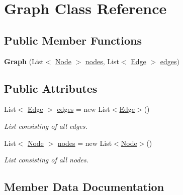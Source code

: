 \hypertarget{class_graph}{}\section{Graph Class Reference}
\label{class_graph}
\subsection*{Public Member Functions}
\begin{DoxyCompactItemize}
\item 
\mbox{\label{class_graph_a4a67baa48ef20f9fdbd80b0b7e5788d2}} 
{\bfseries Graph} (List$<$ \mbox{\hyperlink{class_node}{Node}} $>$ \mbox{\hyperlink{class_graph_a5ecc9c1538b1c81f615e5cfd12f29816}{nodes}}, List$<$ \mbox{\hyperlink{class_edge}{Edge}} $>$ \mbox{\hyperlink{class_graph_a4647d3fa90942e128f3f4612a4838c23}{edges}})
\end{DoxyCompactItemize}
\subsection*{Public Attributes}
\begin{DoxyCompactItemize}
\item 
List$<$ \mbox{\hyperlink{class_edge}{Edge}} $>$ \mbox{\hyperlink{class_graph_a4647d3fa90942e128f3f4612a4838c23}{edges}} = new List$<$\mbox{\hyperlink{class_edge}{Edge}}$>$()
\begin{DoxyCompactList}\small\item\em List consisting of all edges. \end{DoxyCompactList}\item 
List$<$ \mbox{\hyperlink{class_node}{Node}} $>$ \mbox{\hyperlink{class_graph_a5ecc9c1538b1c81f615e5cfd12f29816}{nodes}} = new List$<$\mbox{\hyperlink{class_node}{Node}}$>$()
\begin{DoxyCompactList}\small\item\em List consisting of all nodes. \end{DoxyCompactList}\end{DoxyCompactItemize}


\subsection{Member Data Documentation}
\mbox{\label{class_graph_a4647d3fa90942e128f3f4612a4838c23}} 
